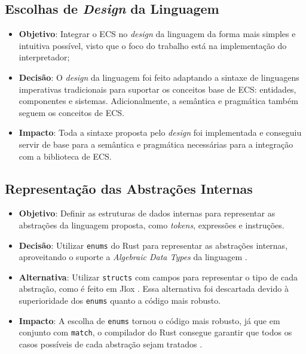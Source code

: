 \subsection{Escolhas de \textit{Design} da Linguagem}

\begin{itemize}
	\item \textbf{Objetivo}: Integrar o ECS no \textit{design} da linguagem da forma mais simples e intuitiva possível, visto que o foco do trabalho está na implementação do interpretador;
	\item \textbf{Decisão}: O \textit{design} da linguagem foi feito adaptando a sintaxe de linguagens imperativas tradicionais para suportar os conceitos base de ECS: entidades, componentes e sistemas. Adicionalmente, a semântica e pragmática também seguem os conceitos de ECS.
	\item \textbf{Impacto}: Toda a sintaxe proposta pelo \textit{design} foi implementada e conseguiu servir de base para a semântica e pragmática necessárias para a integração com a biblioteca de ECS.
\end{itemize}

\subsection{Representação das Abstrações Internas}

\begin{itemize}
	\item \textbf{Objetivo}: Definir as estruturas de dados internas para representar as abstrações da linguagem proposta, como \textit{tokens}, expressões e instruções.
	\item \textbf{Decisão}: Utilizar \texttt{enums} do Rust para representar as abstrações internas, aproveitando o suporte a \textit{Algebraic Data Types} da linguagem \cite{rustbook}.
	\item \textbf{Alternativa}: Utilizar \texttt{structs} com campos para representar o tipo de cada abstração, como é feito em Jlox \cite{craftinginterpreters}. Essa alternativa foi descartada devido à superioridade dos \texttt{enums} quanto a código mais robusto.
	\item \textbf{Impacto}: A escolha de \texttt{enums} tornou o código mais robusto, já que em conjunto com \texttt{match}, o compilador do Rust consegue garantir que todos os casos possíveis de cada abstração sejam tratados \cite{rustbook}.
\end{itemize}

